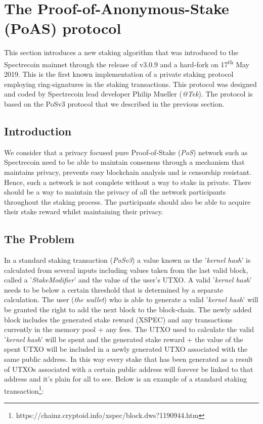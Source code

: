 \section{The Proof-of-Anonymous-Stake (PoAS) protocol}
This section introduces a new staking algorithm that was introduced to the
Spectrecoin mainnet through the release of v3.0.9 and a hard-fork on
17\textsuperscript{th} May 2019. This is the first known implementation
of a private staking protocol employing ring-signatures in the staking
transactions. This protocol was designed and coded by Spectrecoin lead
developer Philip Mueller (\textit{@Tek}). The protocol is based on the
PoSv3 protocol that we described in the previous section.



\subsection{Introduction}
We consider that a privacy focused pure Proof-of-Stake (\textit{PoS})
network such as Spectrecoin need to be able to maintain consensus through
a mechanism that maintains privacy, prevents easy blockchain analysis and
is censorship resistant. Hence, such a network is not complete without a
way to stake in private. There should be a way to maintain the privacy of
all the network participants throughout the staking process. The
participants should also be able to acquire their stake reward whilst
maintaining their privacy.



\subsection{The Problem}

In a standard staking transaction (\textit{PoSv3}) a value known as the
'\textit{kernel hash}' is calculated from several inputs including values
taken from the last valid block, called a '\textit{StakeModifier}' and
the value of the user's UTXO. A valid '\textit{kernel hash}' needs to be
below a certain threshold that is determined by a separate calculation.
The user (\textit{the wallet}) who is able to generate a valid
'\textit{kernel hash}' will be granted the right to add the next block
to the block-chain. The newly added block includes the generated stake
reward (XSPEC) and any transactions currently in the memory pool + any
fees. The UTXO used to calculate the valid '\textit{kernel hash}' will
be spent and the generated stake reward + the value of the spent UTXO
will be included in a newly generated UTXO associated with the same public
address. In this way every stake that has been generated as a result of
UTXOs associated with a certain public address will forever be linked to
that address and it's plain for all to see. Below is an example of a
standard staking transaction\footnote{https://chainz.cryptoid.info/xspec/block.dws?1190944.htm}:



